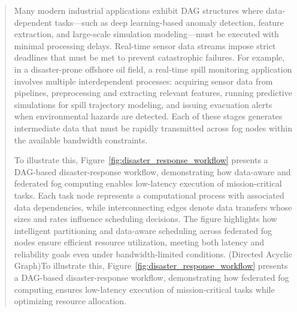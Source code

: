 \documentclass[conference]{IEEEtran}
\begin{document}
\begin{abstract}
Many modern industrial applications exhibit DAG structures where data-dependent tasks—such as deep learning-based anomaly detection, feature extraction, and large-scale simulation modeling—must be executed with minimal processing delays. Real-time sensor data streams impose strict deadlines that must be met to prevent catastrophic failures. For example, in a disaster-prone offshore oil field, a real-time spill monitoring application involves multiple interdependent processes: acquiring sensor data from pipelines, preprocessing and extracting relevant features, running predictive simulations for spill trajectory modeling, and issuing evacuation alerts when environmental hazards are detected. Each of these stages generates intermediate data that must be rapidly transmitted across fog nodes within the available bandwidth constraints.

To illustrate this, Figure~\ref{fig:disaster_response_workflow} presents a DAG-based disaster-response workflow, demonstrating how data-aware and federated fog computing enables low-latency execution of mission-critical tasks. Each task node represents a computational process with associated data dependencies, while interconnecting edges denote data transfers whose sizes and rates influence scheduling decisions. The figure highlights how intelligent partitioning and data-aware scheduling across federated fog nodes ensure efficient resource utilization, meeting both latency and reliability goals even under bandwidth-limited conditions.
(Directed Acyclic Graph)To illustrate this, Figure~\ref{fig:disaster_response_workflow} presents a DAG-based disaster-response workflow, demonstrating how federated fog computing ensures low-latency execution of mission-critical tasks while optimizing resource allocation.





\end{abstract}
\end{document}
